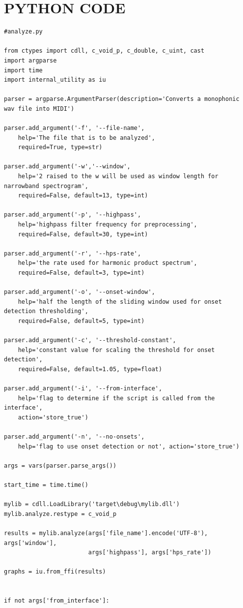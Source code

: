 \documentclass[a4paper,12pt]{report}
\begin{document}
\chapter{PYTHON CODE}
\begin{verbatim}
#analyze.py

from ctypes import cdll, c_void_p, c_double, c_uint, cast
import argparse
import time
import internal_utility as iu

parser = argparse.ArgumentParser(description='Converts a monophonic wav file into MIDI')

parser.add_argument('-f', '--file-name',
    help='The file that is to be analyzed',
    required=True, type=str)

parser.add_argument('-w','--window', 
    help='2 raised to the w will be used as window length for narrowband spectrogram', 
    required=False, default=13, type=int)

parser.add_argument('-p', '--highpass', 
    help='highpass filter frequency for preprocessing',
    required=False, default=30, type=int)

parser.add_argument('-r', '--hps-rate', 
    help='the rate used for harmonic product spectrum',
    required=False, default=3, type=int)

parser.add_argument('-o', '--onset-window',
    help='half the length of the sliding window used for onset detection thresholding',
    required=False, default=5, type=int)

parser.add_argument('-c', '--threshold-constant',
    help='constant value for scaling the threshold for onset detection',
    required=False, default=1.05, type=float)

parser.add_argument('-i', '--from-interface',
    help='flag to determine if the script is called from the interface',
    action='store_true')

parser.add_argument('-n', '--no-onsets',
    help='flag to use onset detection or not', action='store_true')

args = vars(parser.parse_args())

start_time = time.time()

mylib = cdll.LoadLibrary('target\debug\mylib.dll')
mylib.analyze.restype = c_void_p

results = mylib.analyze(args['file_name'].encode('UTF-8'), args['window'], 
                        args['highpass'], args['hps_rate'])

graphs = iu.from_ffi(results)  


if not args['from_interface']:


\end{verbatim}
\end{document}

